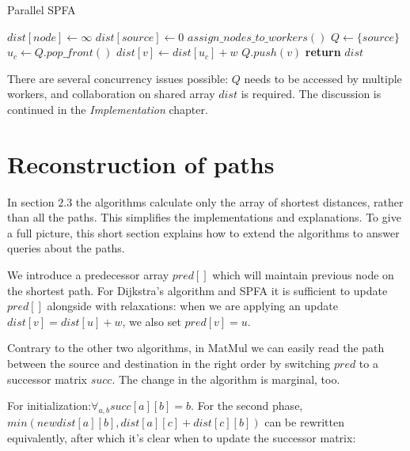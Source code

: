 \documentclass[12pt,a4paper,oneside,openright]{report}
\begin{document}
\begin{algorithm}
\caption{Parallel SPFA}\label{pspfa}
\begin{algorithmic}[1]
    \State $dist[node] \gets \infty$
\EndFor
\State $dist[source] \gets 0$
\State $assign\_nodes\_to\_workers()$
\State $Q \gets \{source\}$ 
        \State $u_c \gets Q.pop\_front()$
            \State $dist[v] \gets dist[u_c] + w$
                \State $Q.push(v)$
                \EndIf
        \EndIf
        \EndFor
      \EndFor
    \EndWhile
\State \textbf{return} $dist$
\EndProcedure
\end{algorithmic}
\end{algorithm}

There are several concurrency issues possible: $Q$ needs to be accessed by multiple workers, and collaboration on shared array $dist$ is required. The discussion is continued in the \textit{Implementation} chapter.

\section{Reconstruction of paths}
In section $2.3$ the algorithms calculate only the array of shortest distances, rather than all the paths. This simplifies the implementations and explanations. To give a full picture, this short section explains how to extend the algorithms to answer queries about the paths.

We introduce a predecessor array $pred[]$ which will maintain previous node on the shortest path. For Dijkstra's algorithm and SPFA it is sufficient to update $pred[]$ alongside with relaxations: when we are applying an update $dist[v] = dist[u] + w$, we also set $pred[v] = u$.

Contrary to the other two algorithms, in MatMul we can easily read the path between the source and destination in the right order by switching $pred$ to a successor matrix $succ$. The change in the algorithm is marginal, too. 

For initialization:$\displaystyle\mathop{\forall}_{a,b}succ[a][b] = b$. For the second phase, $min(newdist[a][b],dist[a][c]+dist[c][b])$ can be rewritten equivalently, after which it's clear when to update the successor matrix:
\end{document}
